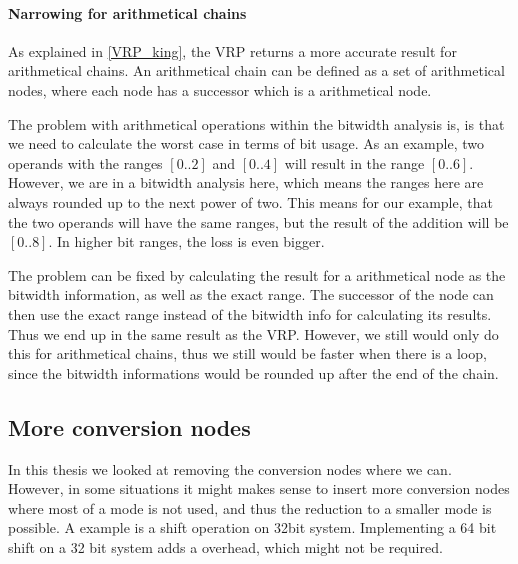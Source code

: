 \paragraph{Narrowing for arithmetical chains}
As explained in \ref{VRP_king}, the VRP returns a more accurate result for arithmetical chains. An arithmetical chain can be defined as a set of arithmetical nodes, where each node has a successor which is a arithmetical node.

The problem with arithmetical operations within the bitwidth analysis is, is that we need to calculate the worst case in terms of bit usage. As an example, two operands with the ranges $[0..2]$ and $[0..4]$ will result in the range $[0..6]$. However, we are in a bitwidth analysis here, which means the ranges here are always rounded up to the next power of two. This means for our example, that the two operands will have the same ranges, but the result of the addition will be $[0..8]$. In higher bit ranges, the loss is even bigger.

The problem can be fixed by calculating the result for a arithmetical node as the bitwidth information, as well as the exact range. The successor of the node can then use the exact range instead of the bitwidth info for calculating its results. Thus we end up in the same result as the VRP. However, we still would only do this for arithmetical chains, thus we still would be faster when there is a loop, since the bitwidth informations would be rounded up after the end of the chain.

\subsection{More conversion nodes}
In this thesis we looked at removing the conversion nodes where we can. However, in some situations it might makes sense to insert more conversion nodes where most of a mode is not used, and thus the reduction to a smaller mode is possible. A example is a shift operation on 32bit system. Implementing a 64 bit shift on a 32 bit system adds a overhead, which might not be required.